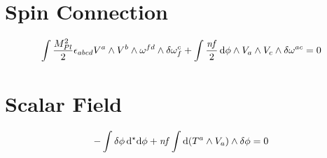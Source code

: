 \documentclass[12pt]{article}
\newcommand{\hodge}{{^\star}}
\begin{document}
\section{Spin Connection}
\begin{align*}
  \int \frac{M_{Pl}^2}{2} \epsilon_{abcd} V^a \wedge V^b \wedge \omega^{fd} \wedge \var{\omega^c_f} + \int \frac{\mathit{nf}}{2} \dd{\phi} \wedge V_a \wedge V_c \wedge \var{\omega^{ac}} = 0
\end{align*}

\section{Scalar Field}
\begin{align*}
  - \int \var{\phi}\dd{\hodge{\dd{\phi}}} + \mathit{nf} \int \dd(T^a \wedge V_a) \wedge \var{\phi} = 0
\end{align*}
\end{document}

